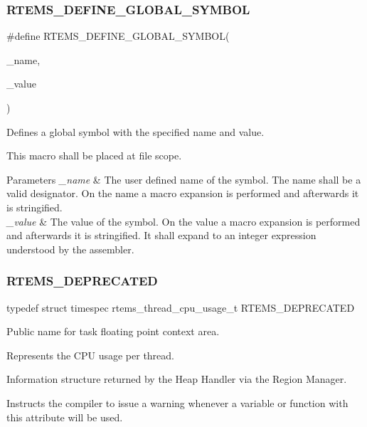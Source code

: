 \subsubsection{\texorpdfstring{RTEMS\_DEFINE\_GLOBAL\_SYMBOL}{RTEMS\_DEFINE\_GLOBAL\_SYMBOL}}
{\footnotesize\ttfamily \#define R\+T\+E\+M\+S\+\_\+\+D\+E\+F\+I\+N\+E\+\_\+\+G\+L\+O\+B\+A\+L\+\_\+\+S\+Y\+M\+B\+OL(\begin{DoxyParamCaption}\item[{}]{\+\_\+name,  }\item[{}]{\+\_\+value }\end{DoxyParamCaption})}



Defines a global symbol with the specified name and value. 

This macro shall be placed at file scope.


\begin{DoxyParams}{Parameters}
{\em \+\_\+name} & The user defined name of the symbol. The name shall be a valid designator. On the name a macro expansion is performed and afterwards it is stringified. \\
\hline
{\em \+\_\+value} & The value of the symbol. On the value a macro expansion is performed and afterwards it is stringified. It shall expand to an integer expression understood by the assembler. \\
\hline
\end{DoxyParams}
\mbox{\label{group__RTEMSScoreBaseDefs_ga6e7bd1624f0779bd750f1726e15cb910}} 
\subsubsection{\texorpdfstring{RTEMS\_DEPRECATED}{RTEMS\_DEPRECATED}}
{\footnotesize\ttfamily typedef struct timespec rtems\+\_\+thread\+\_\+cpu\+\_\+usage\+\_\+t R\+T\+E\+M\+S\+\_\+\+D\+E\+P\+R\+E\+C\+A\+T\+ED}



Public name for task floating point context area. 

Represents the C\+PU usage per thread.

Information structure returned by the Heap Handler via the Region Manager.

Instructs the compiler to issue a warning whenever a variable or function with this attribute will be used.

